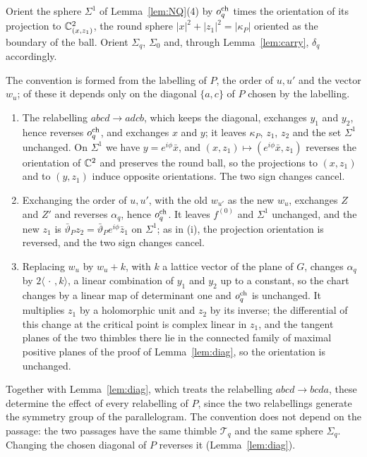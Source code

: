 \begin{definition}\label{def:orient}
Orient the sphere $\Sigma^1$ of Lemma~\ref{lem:NQ}(4) by $o^{\rm ch}_q$ times the orientation of its projection to
$\mathbb C^2_{(x,z_1)}$, the round sphere $|x|^2+|z_1|^2=|\kappa_P|$ oriented as the boundary of the ball. Orient $\Sigma_q$,
$\Sigma_0$ and, through Lemma~\ref{lem:carry}, $\delta_q$ accordingly.
\end{definition}

The convention is formed from the labelling of $P$, the order of $u,u'$ and the vector $w_u$; of these it depends only
on the diagonal $\{a,c\}$ of $P$ chosen by the labelling.
\begin{enumerate}
\item[(i)] The relabelling $abcd\to adcb$, which keeps the diagonal, exchanges $y_1$ and $y_2$, hence reverses
$o^{\rm ch}_q$, and exchanges $x$ and $y$; it leaves $\kappa_P$, $z_1$, $z_2$ and the set $\Sigma^1$ unchanged. On
$\Sigma^1$ we have $y=e^{i\phi}\bar x$, and $(x,z_1)\mapsto(e^{i\phi}\bar x,z_1)$ reverses the orientation of $\mathbb C^2$ and
preserves the round ball, so the projections to $(x,z_1)$ and to $(y,z_1)$ induce opposite orientations. The two sign
changes cancel.
\item[(ii)] Exchanging the order of $u,u'$, with the old $w_{u'}$ as the new $w_u$, exchanges $Z$ and $Z'$ and reverses
$\alpha_q$, hence $o^{\rm ch}_q$. It leaves $f^{(0)}$ and $\Sigma^1$ unchanged, and the new $z_1$ is
$\bar\vartheta_Pz_2=\bar\vartheta_Pe^{i\phi}\bar z_1$ on $\Sigma^1$; as in (i), the projection orientation is reversed,
and the two sign changes cancel.
\item[(iii)] Replacing $w_u$ by $w_u+k$, with $k$ a lattice vector of the plane of $G$, changes $\alpha_q$ by
$2\langle\,\cdot\,,k\rangle$, a linear combination of $y_1$ and $y_2$ up to a constant, so the chart changes by a
linear map of determinant one and $o^{\rm ch}_q$ is unchanged. It multiplies $z_1$ by a holomorphic unit and $z_2$ by
its inverse; the differential of this change at the critical point is complex linear in $z_1$, and the tangent planes of
the two thimbles there lie in the connected family of maximal positive planes of the proof of Lemma~\ref{lem:diag}, so
the orientation is unchanged.
\end{enumerate}
Together with Lemma~\ref{lem:diag}, which treats the relabelling $abcd\to bcda$, these determine the effect of every
relabelling of $P$, since the two relabellings generate the symmetry group of the parallelogram. The convention does not
depend on the passage: the two passages have the same thimble $\mathscr T_q$ and the same sphere $\Sigma_q$. Changing the chosen diagonal of $P$ reverses it (Lemma~\ref{lem:diag}).

